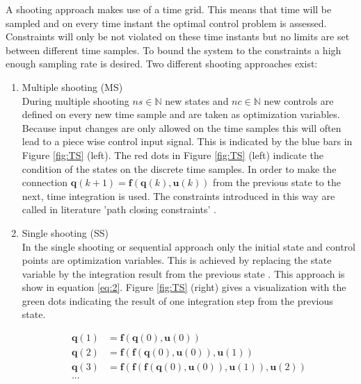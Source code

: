 A shooting approach makes use of a time grid. This means that time will be sampled and on every time instant the optimal control problem is assessed. Constraints will only be not violated on these time instants but no limits are set between different time samples. To bound the system to the constraints a high enough sampling rate is desired. \cite{Mercy2018}
Two different shooting approaches exist:\\
\begin{enumerate}
	\item Multiple shooting (MS)\\
	During multiple shooting $ns\in \mathbb{N}$ new states and $nc \in \mathbb{N}$ new controls are defined on every new time sample and are taken as optimization variables. Because input changes are only allowed on the time samples this will often lead to a piece wise control input signal. This is indicated by the blue bars in Figure \ref{fig:TS} (left). The red dots in Figure \ref{fig:TS} (left) indicate the condition of the states on the discrete time samples. In order to make the connection $\bm{q}(k+1) = \bm{f}(\bm{q}(k), \bm{u}(k))$ from the previous state to the next, time integration is used. The constraints introduced in this way are called in literature 'path closing constraints' \cite{Gillis2019}. \\
	
	\item Single shooting (SS)\\  
	In the single shooting or sequential approach only the initial state and control points are optimization variables. This is achieved by replacing the state variable by the integration result from the previous state \cite{Gillis2019}. This approach is show in equation \ref{eq:2}. Figure \ref{fig:TS} (right) gives a visualization with the green dots indicating the result of one integration step from the previous state.
	
	\begin{equation}\label{eq:2}
	\begin{aligned}
	\bm{q}(1) &= \bm{f}(\bm{q}(0), \bm{u}(0))\\
	\bm{q}(2) &= \bm{f}(\bm{f}(\bm{q}(0), \bm{u}(0)), \bm{u}(1))\\
	\bm{q}(3) &= \bm{f}(\bm{f}(\bm{f}(\bm{q}(0), \bm{u}(0)), \bm{u}(1)), \bm{u}(2))\\
	...
	\end{aligned}
	\end{equation}
\end{enumerate}

